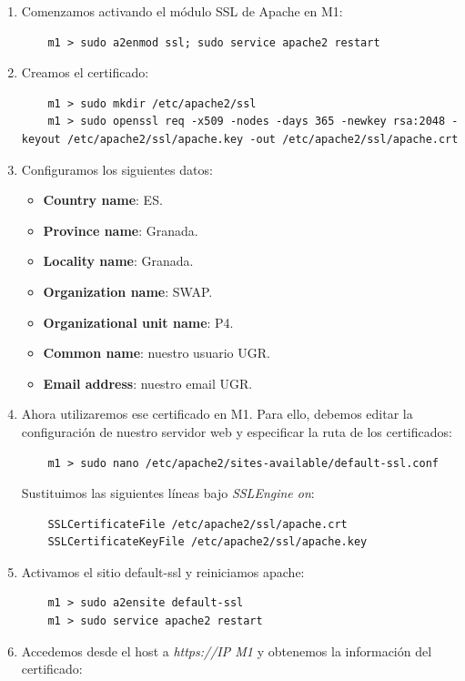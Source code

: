 \documentclass[12pt,spanish]{article}
\begin{document}
\begin{enumerate}
	\item Comenzamos activando el módulo SSL de Apache en M1:
	\begin{lstlisting}
	m1 > sudo a2enmod ssl; sudo service apache2 restart
	\end{lstlisting}
	\item Creamos el certificado:
	\begin{lstlisting}
	m1 > sudo mkdir /etc/apache2/ssl
	m1 > sudo openssl req -x509 -nodes -days 365 -newkey rsa:2048 -keyout /etc/apache2/ssl/apache.key -out /etc/apache2/ssl/apache.crt
	\end{lstlisting}
	\item Configuramos los siguientes datos:
		\begin{itemize}
			\item \textbf{Country name}: ES.
			\item \textbf{Province name}: Granada.
			\item \textbf{Locality name}: Granada.
			\item \textbf{Organization name}: SWAP.
			\item \textbf{Organizational unit name}: P4.
			\item \textbf{Common name}: nuestro usuario UGR.
			\item \textbf{Email address}: nuestro email UGR.
		\end{itemize}
	\item Ahora utilizaremos ese certificado en M1. Para ello, debemos editar la configuración de nuestro servidor web y especificar la ruta de los certificados:
	\begin{lstlisting}
	m1 > sudo nano /etc/apache2/sites-available/default-ssl.conf
	\end{lstlisting}
	Sustituimos las siguientes líneas bajo \emph{SSLEngine on}:
	\begin{lstlisting}
	SSLCertificateFile /etc/apache2/ssl/apache.crt
	SSLCertificateKeyFile /etc/apache2/ssl/apache.key
	\end{lstlisting}
	\item Activamos el sitio default-ssl y reiniciamos apache:
	\begin{lstlisting}
	m1 > sudo a2ensite default-ssl
	m1 > sudo service apache2 restart
	\end{lstlisting}
	\item Accedemos desde el host a \emph{https://IP M1} y obtenemos la información del certificado:
	\begin{figure}[H]

\end{figure}
\end{enumerate}
\end{document}
